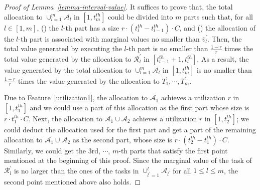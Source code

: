 \documentclass[10pt,journal,compsoc]{IEEEtran}
\newcommand{\rmnum}[1]{\romannumeral #1}
\begin{document}
\begin{proof}[Proof of Lemma~\ref{lemma-interval-value}]
It suffices to prove that, the total allocation to $\cup_{l=1}^{m}{\mathcal{A}_{l}}$ in $[1, t_{m}^{th}]$ could be divided into $m$ parts such that, for all $l\in [1, m]$, (\rmnum{1}) the $l$-th part has a size $r\cdot (t_{l}^{th}-t_{l-1}^{th})\cdot C$, and (\rmnum{2}) the allocation of the $l$-th part is associated with marginal values no smaller than $\overline{v}_{l}^{\prime}$. Then, the total value generated by executing the $l$-th part is no smaller than $\frac{1-r}{r}$ times the total value generated by the allocation to $\mathcal{R}_{l}^{\prime}$ in $[t_{l-1}^{th}+1, t_{l}^{th}]$. As a result, the value generated by the total allocation to $\cup_{l=1}^{m}{\mathcal{A}_{l}}$ in $[1, t_{m}^{th}]$ is no smaller than $\frac{1-r}{r}$ times the value generated by the allocation to $T_{1}^{\prime}, \cdots, T_{m}^{\prime}$.


Due to Feature~\ref{utilization1}, the allocation to $\mathcal{A}_{1}$ achieves a utilization $r$ in $[1, t_{1}^{th}]$ and we could use a part of this allocation as the first part whose size is $r\cdot t_{1}^{th}\cdot C$. Next, the allocation to $\mathcal{A}_{1}\cup\mathcal{A}_{2}$ achieves a utilization $r$ in $[1, t_{2}^{th}]$; we could deduct the allocation used for the first part and get a part of the remaining allocation to $\mathcal{A}_{1}\cup\mathcal{A}_{2}$ as the second part, whose size is $r\cdot (t_ {2}^{th}-t_ {1}^{th})\cdot C$. Similarly, we could get the 3rd, $\cdots$, $m$-th parts that satisfy the first point mentioned at the beginning of this proof. Since the marginal value of the task of $\mathcal{R}_{l}^{\prime}$ is no larger than the ones of the tasks in $\cup_{l^{\prime}=1}^{l}{\mathcal{A}_{l^{\prime}}}$ for all $1\leq l\leq m$, the second point mentioned above also holds.
\end{proof}
\end{document}
